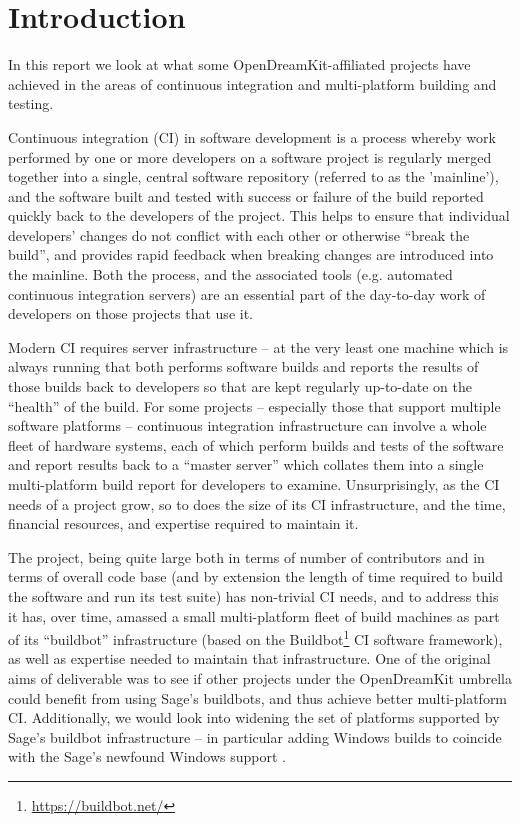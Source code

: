 \documentclass{deliverablereport}
\author{Erik Bray, et. al.}
\begin{document}
\maketitle

\hypertarget{introduction}{%
\section{Introduction}\label{introduction}}

In this report we look at what some OpenDreamKit-affiliated projects have
achieved in the areas of continuous integration and multi-platform building and
testing.

Continuous integration (CI) in software development is a process whereby work
performed by one or more developers on a software project is regularly merged
together into a single, central software repository (referred to as the
'mainline'), and the software built and tested with success or failure of the
build reported quickly back to the developers of the project.  This helps to
ensure that individual developers' changes do not conflict with each other or
otherwise ``break the build'', and provides rapid feedback when breaking changes
are introduced into the mainline.  Both the process, and the associated tools
(e.g. automated continuous integration servers) are an essential part of the
day-to-day work of developers on those projects that use it.

Modern CI requires server infrastructure -- at the very least one machine which
is always running that both performs software builds and reports the results of
those builds back to developers so that are kept regularly up-to-date on the
``health'' of the build.  For some projects --  especially those that support
multiple software platforms -- continuous integration infrastructure can involve
a whole fleet of hardware systems, each of which perform builds and tests of
the software and report results back to a ``master server'' which collates them
into a single multi-platform build report for developers to examine.
Unsurprisingly, as the CI needs of a project grow, so to does the size of its
CI infrastructure, and the time, financial resources, and expertise required to
maintain it.

The \Sage project, being quite large both in terms of number of contributors
and in terms of overall code base (and by extension the length of time required
to build the software and run its test suite) has non-trivial CI needs, and to
address this it has, over time, amassed a small multi-platform fleet of build
machines as part of its ``buildbot'' infrastructure (based on the
Buildbot\footnote{\url{https://buildbot.net/}} CI software framework), as well
as expertise needed to maintain that infrastructure.  One of the original aims
of deliverable was to see if other projects under the OpenDreamKit umbrella
could benefit from using Sage's buildbots, and thus achieve better
multi-platform CI.  Additionally, we would look into widening the set of
platforms supported by Sage's buildbot infrastructure -- in particular adding
Windows builds to coincide with the Sage's newfound Windows support
.
\end{document}

